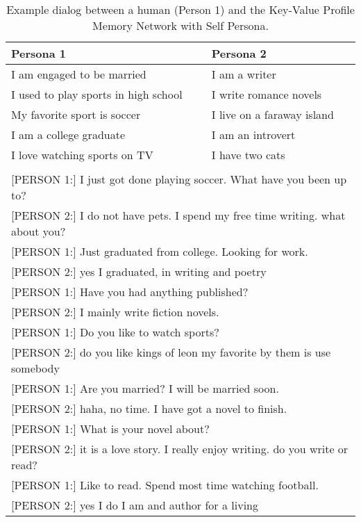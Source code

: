 \documentclass[11pt,a4paper]{article}
\begin{document}
\begin{table*}[t]
  \begin{center}
    \begin{small}
      \begin{tabular}{l|l}
        \toprule
        \textbf{Persona 1} & \textbf{Persona 2}\\
        \midrule
I am engaged to be married & I am a writer \\ 
I used to play sports in high school & I write romance novels\\
My favorite sport is soccer &  I live on a faraway island \\
I am a college graduate& I am an introvert \\
I love watching sports on TV& I have two cats \\
\bottomrule
\multicolumn{2}{l}{ }\\
\multicolumn{2}{l}{[PERSON 1:] I just got done playing soccer. What have you been up to?}\\
\multicolumn{2}{l}{[PERSON 2:] I do not have pets. I spend my free time writing. what about you?}\\
\multicolumn{2}{l}{[PERSON 1:] Just graduated from college. Looking for work. }\\
\multicolumn{2}{l}{[PERSON 2:] yes I graduated, in writing and poetry}\\
\multicolumn{2}{l}{[PERSON 1:] Have you had anything published?}\\
\multicolumn{2}{l}{[PERSON 2:] I mainly write fiction novels.}\\
\multicolumn{2}{l}{[PERSON 1:] Do you like to watch sports?}\\
\multicolumn{2}{l}{[PERSON 2:] do you like kings of leon my favorite by them is use somebody}\\
\multicolumn{2}{l}{[PERSON 1:] Are you married? I will be married soon. }\\
\multicolumn{2}{l}{[PERSON 2:] haha, no time. I have got a novel to finish.}\\
\multicolumn{2}{l}{[PERSON 1:] What is your novel about?}\\
\multicolumn{2}{l}{[PERSON 2:] it is a love story. I really enjoy writing. do you write or read?}\\
\multicolumn{2}{l}{[PERSON 1:] Like to read. Spend most time watching football. }\\
\multicolumn{2}{l}{[PERSON 2:] yes I do I am and author for a living}\\
      \end{tabular}
      \caption{Example dialog between a human (Person 1) and the Key-Value Profile Memory Network with Self Persona. \label{table:kvp-example}}
    \end{small}
  \end{center}
\end{table*}
\end{document}
